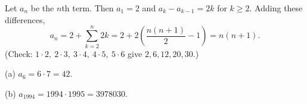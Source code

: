 Let $a_n$ be the $n$th term. Then $a_1=2$ and $a_k-a_{k-1}=2k$ for $k\ge2$. Adding these differences,
\[
a_n=2+\sum_{k=2}^{n}2k=2+2\left(\dfrac{n(n+1)}{2}-1\right)=n(n+1).
\]
(Check: $1\cdot2,\ 2\cdot3,\ 3\cdot4,\ 4\cdot5,\ 5\cdot6$ give $2,6,12,20,30$.)

(a) $a_6=6\cdot7=\boxed{42}$.

(b) $a_{1994}=1994\cdot1995=\boxed{3978030}$.
